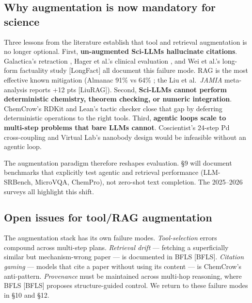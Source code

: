 \documentclass{article}
\begin{document}
\subsection{Why augmentation is now mandatory for science}\label{why-augmentation-is-now-mandatory-for-science}

Three lessons from the literature establish that tool and retrieval augmentation is no longer optional. First, \textbf{un-augmented Sci-LLMs hallucinate citations}. Galactica's retraction \cite{taylor2022arxiv2211090852022}, Hager et al.'s clinical evaluation \cite{hager2024evaluationandmitig}, and Wei et al.'s long-form factuality study {[}LongFact{]} all document this failure mode. RAG is the most effective known mitigation (Almanac 91\% vs 64\% \cite{zakka2024almanacretrievalau}; the Liu et al.~\emph{JAMIA} meta-analysis reports +12 pts {[}LiuRAG{]}). Second, \textbf{Sci-LLMs cannot perform deterministic chemistry, theorem checking, or numeric integration}. ChemCrow's RDKit and Lean's tactic checker close that gap by deferring deterministic operations to the right tools. Third, \textbf{agentic loops scale to multi-step problems that bare LLMs cannot}. Coscientist's 24-step Pd cross-coupling \cite{boiko2023nature6242023} and Virtual Lab's nanobody design \cite{swanson2024thevirtuallabaiage} would be infeasible without an agentic loop.

The augmentation paradigm therefore reshapes evaluation. §9 will document benchmarks that explicitly test agentic and retrieval performance (LLM-SRBench, MicroVQA, ChemPro), not zero-shot text completion. The 2025--2026 surveys \cite{luo2025llm4srasurveyonlar,wei2025fromaiforscienceto,zheng2025fromautomationtoau,hu2025asurveyofscientifi} all highlight this shift.

\subsection{Open issues for tool/RAG augmentation}\label{open-issues-for-toolrag-augmentation}

The augmentation stack has its own failure modes. \emph{Tool-selection} errors compound across multi-step plans. \emph{Retrieval drift} --- fetching a superficially similar but mechanism-wrong paper --- is documented in BFLS {[}BFLS{]}. \emph{Citation gaming} --- models that cite a paper without using its content --- is ChemCrow's anti-pattern. \emph{Provenance} must be maintained across multi-hop reasoning, where BFLS {[}BFLS{]} proposes structure-guided control. We return to these failure modes in §10 and §12.
\end{document}
